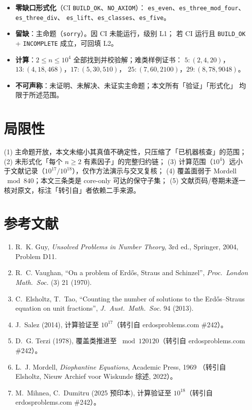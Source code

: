 \documentclass[11pt]{article}
\begin{document}
\begin{itemize}
  \item \textbf{零缺口形式化}（CI \texttt{BUILD_OK}、\texttt{NO\_AXIOM}）：
        \texttt{es\_even}、\texttt{es\_three\_mod\_four}、\texttt{es\_three\_div}、
        \texttt{es\_lift}、\texttt{es\_classes}、\texttt{es\_five}。
  \item \textbf{留缺}：主命题（\texttt{sorry}）。因 CI 未能运行，级别 L1；
        若 CI 运行且 \texttt{BUILD\_OK} + \texttt{INCOMPLETE} 成立，可回填 L2。
  \item \textbf{计算}：$2 \le n \le 10^4$ 全部找到并校验解；难类样例证书：
        $5\colon(2,4,20)$，$13\colon(4,18,468)$，$17\colon(5,30,510)$，
        $25\colon(7,60,2100)$，$29\colon(8,78,9048)$。
  \item \textbf{不可声称}：未证明、未解决、未证实主命题；本文所有「验证」「形式化」
        均限于所述范围。
\end{itemize}

\section{局限性}

(1) 主命题开放，本文未缩小其真值不确定性，只压缩了「已机器核查」的范围；
(2) 未形式化「每个 $n\ge2$ 有素因子」的完整归约链；
(3) 计算范围（$10^4$）远小于文献记录（$10^{17}/10^{18}$），仅作方法演示与交叉复核；
(4) 覆盖面弱于 Mordell $\bmod 840$；本文三条类是 core-only 可达的保守子集；
(5) 文献页码/卷期未逐一核对原文，标注「转引自」者依赖二手来源。

\section*{参考文献}
\begin{enumerate}
  \item R.~K. Guy, \emph{Unsolved Problems in Number Theory}, 3rd ed., Springer, 2004, Problem D11.
  \item R.~C. Vaughan, ``On a problem of Erd\H{o}s, Straus and Schinzel'',
        \emph{Proc.\ London Math.\ Soc.} (3) 21 (1970).
  \item C.~Elsholtz, T.~Tao, ``Counting the number of solutions to the Erd\H{o}s--Straus
        equation on unit fractions'', \emph{J.\ Aust.\ Math.\ Soc.} 94 (2013).
  \item J.~Salez (2014), 计算验证至 $10^{17}$（转引自 erdosproblems.com \#242）。
  \item D.~G. Terzi (1978), 覆盖类推进至 $\bmod 120120$（转引自 erdosproblems.com \#242）。
  \item L.~J. Mordell, \emph{Diophantine Equations}, Academic Press, 1969
        （转引自 Elsholtz, Nieuw Archief voor Wiskunde 综述, 2022）。
  \item M.~Mihnea, C.~Dumitru (2025 预印本), 计算验证至 $10^{18}$（转引自 erdosproblems.com \#242）。
\end{enumerate}
\end{document}
